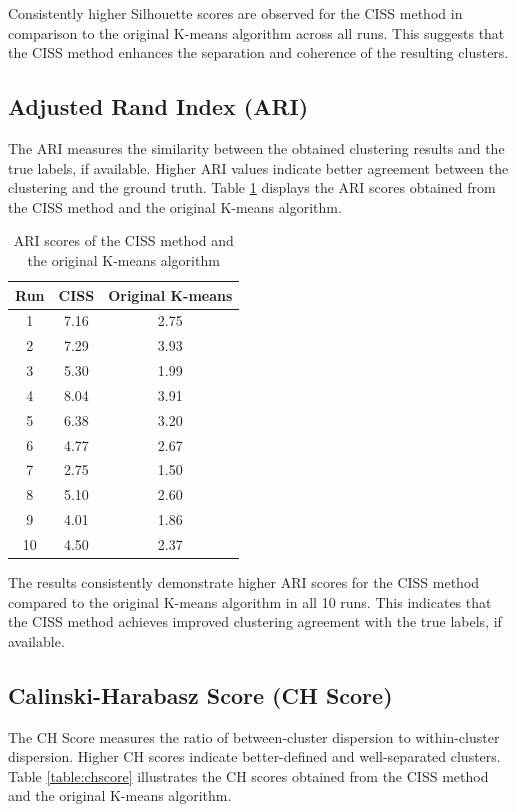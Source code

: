 \documentclass[10pt,twocolumn,a4paper]{article}
\begin{document}
Consistently higher Silhouette scores are observed for the CISS method in comparison to the original K-means algorithm across all runs. This suggests that the CISS method enhances the separation and coherence of the resulting clusters.

\subsection{Adjusted Rand Index (ARI)}

The ARI measures the similarity between the obtained clustering results and the true labels, if available. Higher ARI values indicate better agreement between the clustering and the ground truth. Table \ref{table:ari} displays the ARI scores obtained from the CISS method and the original K-means algorithm.

\begin{table}[ht]
  \centering
  \caption{ARI scores of the CISS method and the original K-means algorithm}
  \label{table:ari}
  \begin{tabular}{ccc}
    \hline
    Run & CISS & Original K-means \\
    \hline
    1   & 7.16 & 2.75 \\
    2   & 7.29 & 3.93 \\
    3   & 5.30 & 1.99 \\
    4   & 8.04 & 3.91 \\
    5   & 6.38 & 3.20 \\
    6   & 4.77 & 2.67 \\
    7   & 2.75 & 1.50 \\
    8   & 5.10 & 2.60 \\
    9   & 4.01 & 1.86 \\
    10  & 4.50 & 2.37 \\
    \hline
  \end{tabular}
\end{table}

The results consistently demonstrate higher ARI scores for the CISS method compared to the original K-means algorithm in all 10 runs. This indicates that the CISS method achieves improved clustering agreement with the true labels, if available.

\subsection{Calinski-Harabasz Score (CH Score)}

The CH Score measures the ratio of between-cluster dispersion to within-cluster dispersion. Higher CH scores indicate better-defined and well-separated clusters. Table \ref{table:chscore} illustrates the CH scores obtained from the CISS method and the original K-means algorithm.
\end{document}
